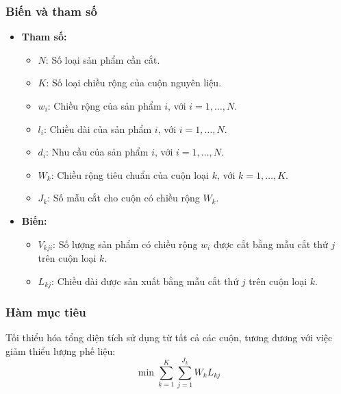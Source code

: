 \subsubsection{Biến và tham số}  
\begin{itemize}  
    \item \textbf{Tham số:}  
    \begin{itemize}  
        \item $N$: Số loại sản phẩm cần cắt.  
        \item $K$: Số loại chiều rộng của cuộn nguyên liệu.  
        \item $w_i$: Chiều rộng của sản phẩm $i$, với $i = 1, \dots, N$.  
        \item $l_i$: Chiều dài của sản phẩm $i$, với $i = 1, \dots, N$.  
        \item $d_i$: Nhu cầu của sản phẩm $i$, với $i = 1, \dots, N$.  
        \item $W_k$: Chiều rộng tiêu chuẩn của cuộn loại $k$, với $k = 1, \dots, K$.  
        \item $J_k$: Số mẫu cắt cho cuộn có chiều rộng $W_k$.  
    \end{itemize}  

    \item \textbf{Biến:}  
    \begin{itemize}  
        \item $V_{kji}$: Số lượng sản phẩm có chiều rộng $w_i$ được cắt bằng mẫu cắt thứ $j$ trên cuộn loại $k$.  
        \item $L_{kj}$: Chiều dài được sản xuất bằng mẫu cắt thứ $j$ trên cuộn loại $k$.  
    \end{itemize}  
\end{itemize}  

\subsubsection{Hàm mục tiêu}  
Tối thiểu hóa tổng diện tích sử dụng từ tất cả các cuộn, tương đương với việc giảm thiểu lượng phế liệu:  
\[
\min \sum_{k=1}^{K} \sum_{j=1}^{J_k} W_k L_{kj}
\]  

